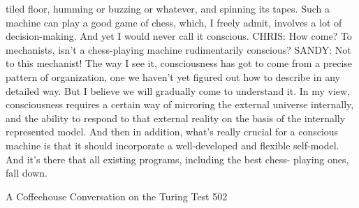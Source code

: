    tiled floor, humming or buzzing or whatever, and spinning its tapes. Such a
   machine can play a good game of chess, which, I freely admit, involves a lot of
   decision-making. And yet I would never call it conscious.
CHRIS: How come? To mechanists, isn't a chess-playing machine rudimentarily
   conscious?
SANDY: Not to this mechanist! The way I see it, consciousness has got to come from
   a precise pattern of organization, one we haven't yet figured out how to describe
   in any detailed way. But I believe we will gradually come to understand it. In my
   view, consciousness requires a certain way of mirroring the external universe
   internally, and the ability to respond to that external reality on the basis of the
   internally represented model. And then in addition, what's really crucial for a
   conscious machine is that it should incorporate a well-developed and flexible
   self-model. And it's there that all existing programs, including the best chess-
   playing ones, fall down.



A Coffeehouse Conversation on the Turing Test                                      502

